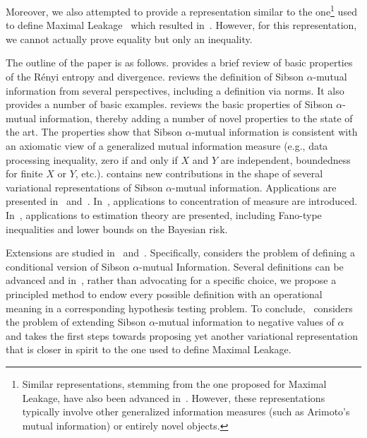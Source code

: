 \documentclass{article}
\numberwithin{theorem}{section}
\numberwithin{example}{section}
\numberwithin{remark}{section}
\numberwithin{definition}{section}
\begin{document}
Moreover, we also attempted to provide a representation similar to the one\footnote{Similar representations, stemming from the one proposed for Maximal Leakage, have also been advanced in~\cite{LiaoKSC:19,KurriKS:22,KurriSK:22}. However, these representations typically involve other generalized information measures (such as Arimoto's mutual information) or entirely novel objects.  } used to define Maximal Leakage~\cite{MaximalLeakage:20} which resulted in~. However, for this representation, we cannot actually prove equality but only an inequality.


The outline of the paper is as follows. 
 provides a brief review of basic properties of the R\'enyi entropy and divergence.
 reviews the definition of Sibson $\alpha$-mutual information from several perspectives, including a definition via norms. It also provides a number of basic examples.
 reviews the basic properties of Sibson $\alpha$-mutual information, thereby adding a number of novel properties to the state of the art. The properties show that Sibson $\alpha$-mutual information is consistent with an axiomatic view of a generalized mutual information measure (e.g., data processing inequality, zero if and only if $X$ and $Y$ are independent, boundedness for finite $X$ or $Y$, etc.).
 contains new contributions in the shape of several variational representations of Sibson $\alpha$-mutual information.
Applications are presented in~ and~. In~, applications to concentration of measure are introduced. In~, applications to estimation theory are presented, including Fano-type inequalities and lower bounds on the Bayesian risk.


Extensions are studied in~ and~.
Specifically,  considers the problem of defining a conditional version of Sibson $\alpha$-mutual Information. Several definitions can be advanced and in~, rather than advocating for a specific choice, we propose a principled method to endow every possible definition with an operational meaning in a corresponding hypothesis testing problem. To conclude,~ considers the problem of extending Sibson $\alpha$-mutual information to negative values of $\alpha$ and takes the first steps towards proposing yet another variational representation that is closer in spirit to the one used to define Maximal Leakage.
\end{document}

